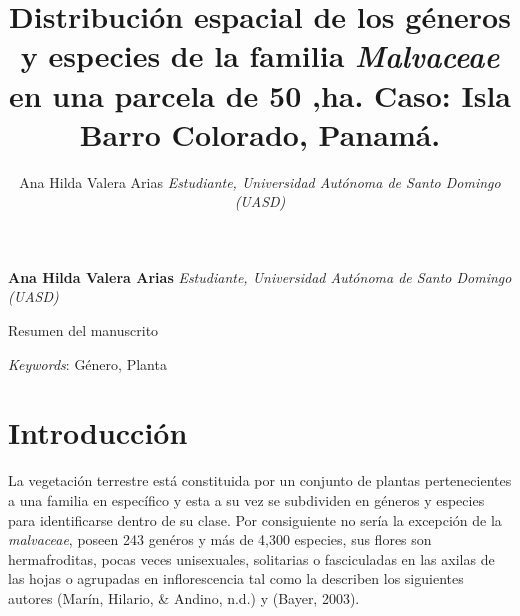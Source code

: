 \documentclass[11pt,]{article}
\title{Distribución espacial de los géneros y especies de la familia
\emph{Malvaceae} en una parcela de 50 ,ha. Caso: Isla Barro Colorado,
Panamá.  }
\author{\Large Ana Hilda Valera Arias\vspace{0.05in} \newline\normalsize\emph{Estudiante, Universidad Autónoma de Santo Domingo (UASD)}  }
\date{}
\newcommand*{\authorfont}{\fontfamily{phv}\selectfont}
\renewenvironment{abstract}
 {{%
    \setlength{\leftmargin}{0mm}
    \setlength{\rightmargin}{\leftmargin}%
  }%
  \relax}
 {\endlist}
\begin{document}
	
%

{%
\setlength{\parindent}{0pt}
\thispagestyle{plain}
{\fontsize{18}{20}\selectfont\raggedright 
\maketitle  %

}

{
   \vskip 13.5pt\relax \normalsize\fontsize{11}{12} 
\textbf{\authorfont Ana Hilda Valera Arias} \hskip 15pt \emph{\small Estudiante, Universidad Autónoma de Santo Domingo (UASD)}   

}

}








\begin{abstract}

    \hbox{\vrule height .2pt width 39.14pc}

    \vskip 8.5pt %

\noindent Resumen del manuscrito


\vskip 8.5pt \noindent \emph{Keywords}: Género, Planta \par

    \hbox{\vrule height .2pt width 39.14pc}



\end{abstract}


\vskip 6.5pt


\noindent  \section{Introducción}\label{introducciuxf3n}

La vegetación terrestre está constituida por un conjunto de plantas
pertenecientes a una familia en específico y esta a su vez se subdividen
en géneros y especies para identificarse dentro de su clase. Por
consiguiente no sería la excepción de la \emph{malvaceae}, poseen 243
genéros y más de 4,300 especies, sus flores son hermafroditas, pocas
veces unisexuales, solitarias o fasciculadas en las axilas de las hojas
o agrupadas en inflorescencia tal como la describen los siguientes
autores (Marín, Hilario, \& Andino, n.d.) y (Bayer, 2003).
\end{document}
